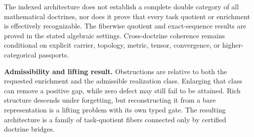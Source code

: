 \begin{boundary}
\label{bnd:block19-second-order-scope}
The indexed architecture does not establish a complete double category of all mathematical doctrines, nor does it prove that every task quotient or enrichment is effectively recognizable.  The fiberwise quotient and exact-sequence results are proved in the stated algebraic settings.  Cross-doctrine coherence remains conditional on explicit carrier, topology, metric, tensor, convergence, or higher-categorical passports.
\end{boundary}

\begin{resultbox}
\textbf{Admissibility and lifting result.}
Obstructions are relative to both the requested enrichment and the admissible realization class.  Enlarging that class can remove a positive gap, while zero defect may still fail to be attained.  Rich structure descends under forgetting, but reconstructing it from a bare representation is a lifting problem with its own typed gate.  The resulting architecture is a family of task-quotient fibers connected only by certified doctrine bridges.
\end{resultbox}
